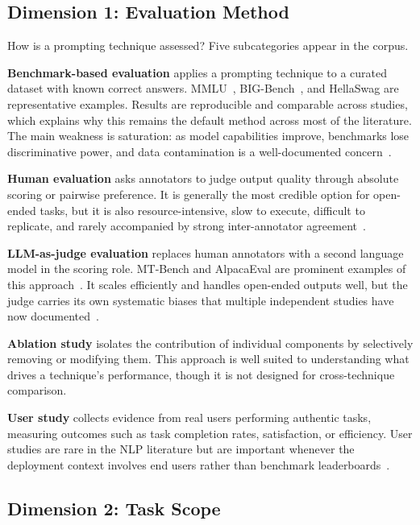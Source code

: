\documentclass[journal]{IEEEtran}
\begin{document}
\subsection{Dimension 1: Evaluation Method}

How is a prompting technique assessed? Five subcategories appear in the corpus.

\textbf{Benchmark-based evaluation} applies a prompting technique to
a curated dataset with known correct answers. MMLU~\cite{hendrycks2021measuring},
BIG-Bench~\cite{srivastava2022bigbench}, and HellaSwag are representative examples.
Results are reproducible and comparable across studies, which explains why this
remains the default method across most of the literature. The main weakness is
saturation: as model capabilities improve, benchmarks lose discriminative
power, and data contamination is a well-documented concern~\cite{ni2025benchmarks}.

\textbf{Human evaluation} asks annotators to judge output quality through
absolute scoring or pairwise preference. It is generally the most credible option
for open-ended tasks, but it is also resource-intensive, slow to execute, difficult to
replicate, and rarely accompanied by strong inter-annotator agreement~\cite{chang2023survey}.

\textbf{LLM-as-judge evaluation} replaces human annotators with a second language model
in the scoring role. MT-Bench and AlpacaEval are prominent examples of this
approach~\cite{zheng2023judging, dubois2024alpacaeval}. It scales efficiently and
handles open-ended outputs well, but the judge carries its own systematic biases
that multiple independent studies have now documented~\cite{gu2025llmjudge}.

\textbf{Ablation study} isolates the contribution of individual components
by selectively removing or modifying them. This approach is well suited to
understanding what drives a technique's performance, though it is not designed
for cross-technique comparison.

\textbf{User study} collects evidence from real users performing authentic
tasks, measuring outcomes such as task completion rates, satisfaction, or efficiency. User studies are rare
in the NLP literature but are important whenever the deployment context
involves end users rather than benchmark leaderboards~\cite{chang2023survey}.

\subsection{Dimension 2: Task Scope}
\end{document}
